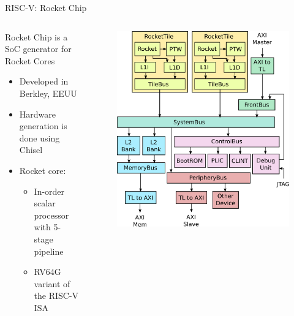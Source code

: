 \begin{frame}{RISC-V: Rocket Chip}
\begin{columns}[T]
  \begin{column}{0.5\textwidth} %
Rocket Chip is a SoC generator for Rocket Cores
\begin{itemize}
    \item Developed in Berkley, EEUU
    \item Hardware generation is done using Chisel
    \item Rocket core: 
    \begin{itemize}
        \item In-order scalar processor with 5-stage pipeline
        \item RV64G variant of the RISC-V ISA
    \end{itemize}
\end{itemize}
\end{column}
\begin{column}{.5\textwidth} %

\begin{figure}[!ht]
    \includegraphics[width=1\linewidth]{images/rocketchip-diagram.png}
\end{figure}
\end{column}
\end{columns}
\end{frame}


